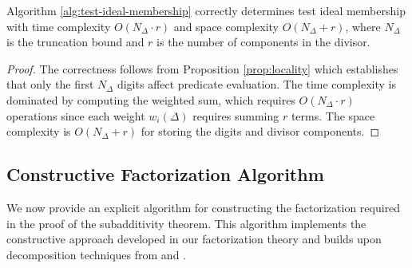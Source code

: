 \begin{theorem}
Algorithm \ref{alg:test-ideal-membership} correctly determines test ideal membership with time complexity $O(N_\Delta \cdot r)$ and space complexity $O(N_\Delta + r)$, where $N_\Delta$ is the truncation bound and $r$ is the number of components in the divisor.
\end{theorem}

\begin{proof}
The correctness follows from Proposition \ref{prop:locality} which establishes that only the first $N_\Delta$ digits affect predicate evaluation. The time complexity is dominated by computing the weighted sum, which requires $O(N_\Delta \cdot r)$ operations since each weight $w_i(\Delta)$ requires summing $r$ terms. The space complexity is $O(N_\Delta + r)$ for storing the digits and divisor components.
\end{proof}

\subsection{Constructive Factorization Algorithm}

We now provide an explicit algorithm for constructing the factorization required in the proof of the subadditivity theorem. This algorithm implements the constructive approach developed in our factorization theory and builds upon decomposition techniques from \cite{MS18} and \cite{BMP+23}.

